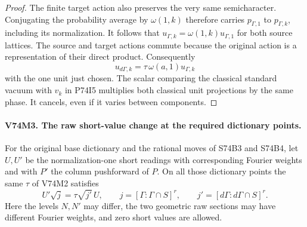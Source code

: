 \begin{proof}
The finite target action also preserves the very same semicharacter.
Conjugating the probability average by $\omega(1,k)$ therefore
carries $p_{\Gamma,1}$ to $p_{\Gamma,k}$, including its
normalization. It follows that
$u_{\Gamma,k}=\omega(1,k)u_{\Gamma,1}$ for both source
lattices. The source and target actions commute because the
original action is a representation of their direct product.
Consequently
\[
          u_{d\Gamma,k}=\tau\,\omega(a,1)u_{\Gamma,k}
\]
with the one unit just chosen. The scalar comparing the classical
standard vacuum with $v_k$ in P74I5 multiplies both classical
unit projections by the same phase. It cancels, even if it
varies between components.
\end{proof}

\paragraph{V74M3. The raw short-value change at the required dictionary points.}
\label{claim:V74M3}
For the original base dictionary and the rational moves of S74B3
and S74B4, let $U,U'$ be the normalization-one short readings with
corresponding Fourier weights and with $P'$ the column pushforward
of $P$. On all those dictionary points the same $\tau$ of V74M2
satisfies
\[
               U'\sqrt{j}=\tau\sqrt{j'}\,U,\qquad
 j=[\Gamma:\Gamma\cap S]^r,\qquad
 j'=[d\Gamma:d\Gamma\cap S]^r .
\]
Here the levels $N,N'$ may differ, the two geometric raw sections
may have different Fourier weights, and zero short values are
allowed.


